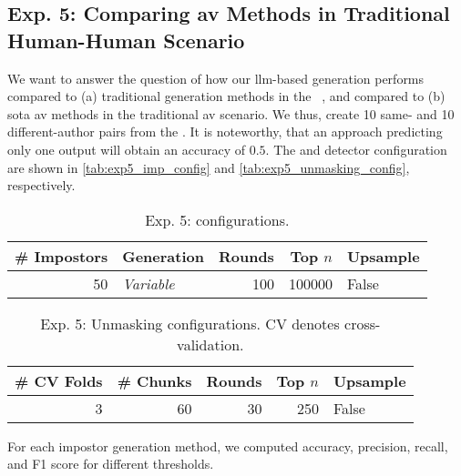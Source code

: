 \subsection{Exp. 5: Comparing \acs{av} Methods in Traditional Human-Human Scenario}
\label{subsec:imp_gen}

We want to answer the question of how our \ac{llm}-based \imp{} generation performs compared to (a) traditional \imp{} generation methods in the \impAppr{}~\citep{koppel_determining_2014}, and compared to (b) \acl{sota} \ac{av} methods in the traditional \ac{av} scenario.
We thus, create 10 same- and 10 different-author pairs from the \dataStudent{}. %
It is noteworthy, that an approach predicting only one output will obtain an accuracy of $0.5$.
The \impAppr{} and \unmasking{} detector configuration are shown in \autoref{tab:exp5_imp_config} and \autoref{tab:exp5_unmasking_config}, respectively.

\begin{table}[h]
\centering\small
\caption{Exp. 5: \impAppr{} configurations.}
\label{tab:exp5_imp_config}
\begin{tabular}{@{}rlrrl@{}}   %
\toprule
\# Impostors & Generation & Rounds & Top $n$ & Upsample \\
\midrule
50 & \textit{Variable} & 100 & \num{100000} & False \\
\bottomrule
\end{tabular}%
\end{table}

\begin{table}[h]
\centering\small
\caption{Exp. 5: Unmasking configurations. CV denotes cross-validation.}
\label{tab:exp5_unmasking_config}
\begin{tabular}{@{}rrrrl@{}}   %
\toprule
\# CV Folds & \# Chunks & Rounds & Top $n$ & Upsample \\
\midrule
3 & 60 & 30 & \num{250} & False \\
\bottomrule
\end{tabular}%
\end{table}

For each impostor generation method, we computed accuracy, precision, recall, and F1 score for different thresholds. 
